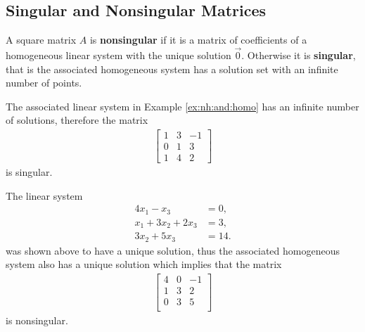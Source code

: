 \subsection{Singular and Nonsingular Matrices}

\begin{definition}
A square matrix $A$ is \textbf{nonsingular} if it is a matrix of coefficients of a homogeneous linear system with the unique solution $\vec{0}$.  Otherwise it is \textbf{singular}, that is the associated homogeneous system has a solution set with an infinite number of points. 
\end{definition}


\begin{example}
The associated linear system in Example \ref{ex:nh:and:homo} has an infinite number of solutions, therefore the matrix 
%
\begin{align*}
\begin{bmatrix}
1 & 3 & -1 \\
0 & 1 & 3 \\
1 & 4 & 2 
\end{bmatrix} 
\end{align*}
is singular. 

The linear system 
%
\begin{align*}
4x_1 - x_3 & = 0, \\
x_1+3x_2 +2x_3 & = 3, \\
3x_2 + 5x_3 & = 14. 
\end{align*}
was shown above to have a unique solution, thus the associated homogeneous system also has a unique solution which implies that the matrix
%
\begin{align*}
\begin{bmatrix}
4 & 0 & -1 \\
1 & 3 & 2  \\
0 & 3 & 5  \\
\end{bmatrix}
\end{align*}
is nonsingular.  

\end{example}

\phantom{hi}


